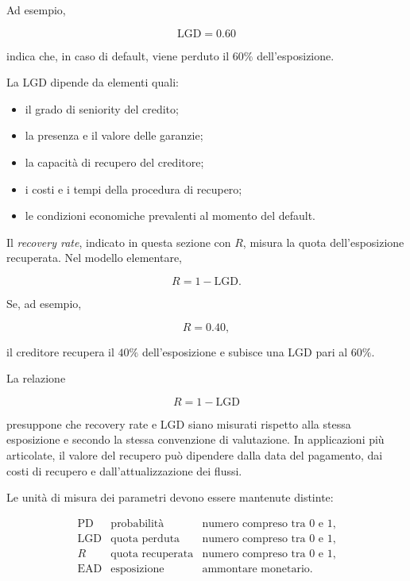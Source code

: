 Ad esempio,

\[
\mathrm{LGD}=0.60
\]

indica che, in caso di default, viene perduto il $60\%$
dell'esposizione.

La LGD dipende da elementi quali:

\begin{itemize}

\item il grado di seniority del credito;

\item la presenza e il valore delle garanzie;

\item la capacit\`{a} di recupero del creditore;

\item i costi e i tempi della procedura di recupero;

\item le condizioni economiche prevalenti al momento del default.

\end{itemize}

Il \emph{recovery rate}, indicato in questa sezione con $R$, misura
la quota dell'esposizione recuperata. Nel modello elementare,

\[
R=1-\mathrm{LGD}.
\]

Se, ad esempio,

\[
R=0.40,
\]

il creditore recupera il $40\%$ dell'esposizione e subisce una LGD
pari al $60\%$.

La relazione

\[
R=1-\mathrm{LGD}
\]

presuppone che recovery rate e LGD siano misurati rispetto alla stessa
esposizione e secondo la stessa convenzione di valutazione. In
applicazioni pi\`{u} articolate, il valore del recupero pu\`{o}
dipendere dalla data del pagamento, dai costi di recupero e
dall'attualizzazione dei flussi.

Le unit\`{a} di misura dei parametri devono essere mantenute distinte:

\[
\begin{array}{lll}
\mathrm{PD}
&
\text{probabilit\`{a}}
&
\text{numero compreso tra $0$ e $1$,}
\\[1mm]
\mathrm{LGD}
&
\text{quota perduta}
&
\text{numero compreso tra $0$ e $1$,}
\\[1mm]
R
&
\text{quota recuperata}
&
\text{numero compreso tra $0$ e $1$,}
\\[1mm]
\mathrm{EAD}
&
\text{esposizione}
&
\text{ammontare monetario.}
\end{array}
\]

